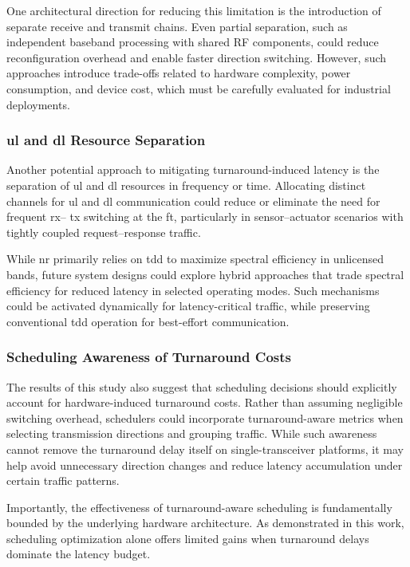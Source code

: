 \documentclass[conference]{IEEEtran}
\begin{document}
One architectural direction for reducing this limitation is the introduction of separate receive and transmit chains. Even partial separation, such as independent baseband processing with shared RF components, could reduce reconfiguration overhead and enable faster direction switching. However, such approaches introduce trade-offs related to hardware complexity, power consumption, and device cost, which must be carefully evaluated for industrial deployments.

\subsubsection{\gls{ul} and \gls{dl} Resource Separation}

Another potential approach to mitigating turnaround-induced latency is the separation of \gls{ul} and \gls{dl} resources in frequency or time. Allocating distinct channels for \gls{ul} and \gls{dl} communication could reduce or eliminate the need for frequent  \gls{rx}-- \gls{tx} switching at the \gls{ft}, particularly in sensor--actuator scenarios with tightly coupled request--response traffic.

While \gls{nr} primarily relies on \gls{tdd} to maximize spectral efficiency in unlicensed bands, future system designs could explore hybrid approaches that trade spectral efficiency for reduced latency in selected operating modes. Such mechanisms could be activated dynamically for latency-critical traffic, while preserving conventional \gls{tdd} operation for best-effort communication.

\subsubsection{Scheduling Awareness of Turnaround Costs}

The results of this study also suggest that scheduling decisions should explicitly account for hardware-induced turnaround costs. Rather than assuming negligible switching overhead, schedulers could incorporate turnaround-aware metrics when selecting transmission directions and grouping traffic. While such awareness cannot remove the turnaround delay itself on single-transceiver platforms, it may help avoid unnecessary direction changes and reduce latency accumulation under certain traffic patterns.

Importantly, the effectiveness of turnaround-aware scheduling is fundamentally bounded by the underlying hardware architecture. As demonstrated in this work, scheduling optimization alone offers limited gains when turnaround delays dominate the latency budget.
\end{document}
